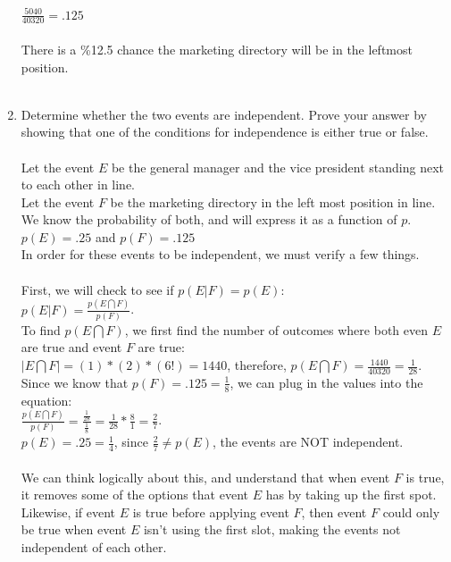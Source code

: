\documentclass{amsart}
\theoremstyle{definition}
\theoremstyle{Exercise}
\theoremstyle{remark}
\theoremstyle{rule}
\numberwithin{equation}{section}
\begin{document}
\begin{enumerate}[label=(\alph*)]
  $\frac{5040}{40320} = .125$\\\\
  There is a \%12.5 chance the marketing directory will be in the leftmost position.
\\\\
  \item Determine whether the two events are independent. Prove your answer by showing that one of the conditions for independence is either true or false.
 \\\\
  Let the event $E$ be the general manager and the vice president standing next to each other in line.\\
  Let the event $F$ be the marketing directory in the left most position in line.\\
  We know the probability of both, and will express it as a function of $p$.\\
  $p(E) = .25$ and $p(F) = .125$\\
  In order for these events to be independent, we must verify a few things.\\\\
  First, we will check to see if $p(E|F) = p(E)$:\\
  $p(E|F) = \frac{p(E \bigcap F)}{p(F)}$.\\
  To find $p(E \bigcap F)$, we first find the number of outcomes where both even $E$ are true and event $F$ are true:\\
  $|E \bigcap F| = (1) * (2) * (6!) = 1440$, therefore, $p(E \bigcap F) = \frac{1440}{40320} = \frac{1}{28}$.\\
  Since we know that $p(F) = .125 = \frac{1}{8}$, we can plug in the values into the equation:\\
  $\frac{p(E \bigcap F)}{p(F)} = \frac{\frac{1}{28}}{\frac{1}{8}} = \frac{1}{28} * \frac{8}{1} = \frac{2}{7}$.\\
  $p(E) = .25 = \frac{1}{4}$, since $\frac{2}{7} \not= p(E)$, the events are NOT independent.\\\\
  We can think logically about this, and understand that when event $F$ is true, it removes some of the options that event $E$ has by taking up the first spot. Likewise, if event $E$ is true before applying event $F$, then event $F$ could only be true when event $E$ isn't using the first slot, making the events not independent of each other.
\\\\
\end{enumerate}
\end{document}
